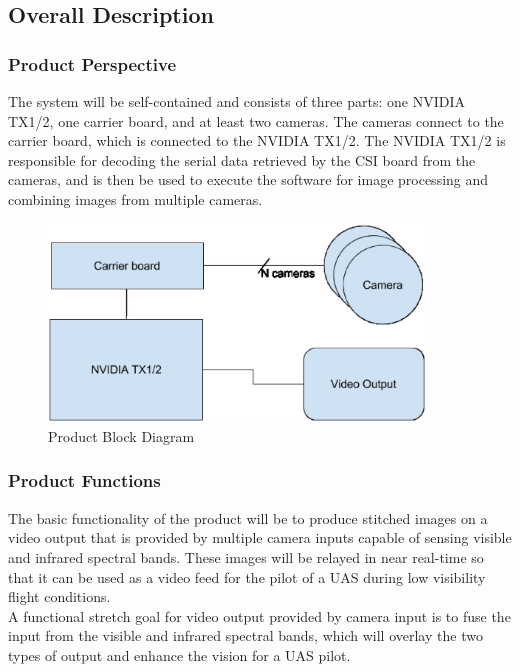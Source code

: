 \documentclass[letterpaper,10pt,serif,draftclsnofoot,onecolumn,compsoc,titlepage]{IEEEtran}
\begin{document}
\subsection{Overall Description}

\subsubsection{Product Perspective}

The system will be self-contained and consists of three parts: one NVIDIA TX1/2, 
one carrier board, and at least two cameras. The cameras connect to the carrier board, 
which is connected to the NVIDIA TX1/2. The NVIDIA TX1/2 is responsible for decoding 
the serial data retrieved by the CSI board from the cameras, and is then be used to 
execute the software for image processing and combining images from multiple cameras.\\

\begin{figure}[H]
	\centering
	\label{fig:ProductBlockDiagram}
	\includegraphics[width=10cm]{images/diagram.eps}
	\caption{Product Block Diagram \label{overflow}}
\end{figure}

\subsubsection{Product Functions}

The basic functionality of the product will be to produce stitched images on a video 
output that is provided by multiple camera inputs capable of sensing visible and 
infrared spectral bands. These images will be relayed in near real-time so that it 
can be used as a video feed for the pilot of a UAS during low visibility flight 
conditions. \\

A functional stretch goal for video output provided by camera input is to fuse the 
input from the visible and infrared spectral bands, which will overlay the two types of output 
and enhance the vision for a UAS pilot. \\
\end{document}
